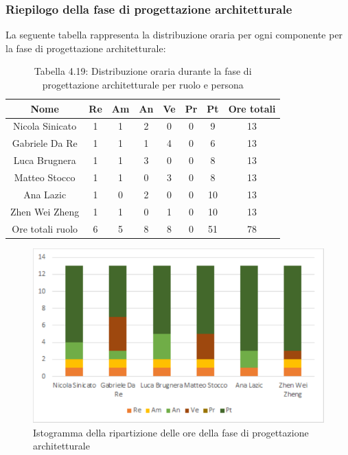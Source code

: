 \subsubsection{Riepilogo della fase di progettazione architetturale }
%
La seguente tabella rappresenta la distribuzione oraria per ogni componente per la fase di progettazione architetturale:
\begin{table}[h]
	\setlength\extrarowheight{5pt}
	\centering
	\begin{tabularx}{\textwidth}{|ccccccc|c|}
		\hline
		\rowcolor{white}
		\textbf{Nome} & \textbf{Re} & \textbf{Am} & \textbf{An} & \textbf{Ve} & \textbf{Pr}& \textbf{Pt} & \textbf{Ore totali} \\
		\hline
		Nicola Sinicato &1&1&2&0&0&9&13 \\
		Gabriele Da Re &1&1&1&4&0&6&13 \\
		Luca Brugnera &1&1&3&0&0&8&13 \\
		Matteo Stocco &1&1&0&3&0&8&13 \\
		Ana Lazic &1&0&2&0&0&10&13 \\
		Zhen Wei Zheng &1&1&0&1&0&10&13 \\
		\hline
		Ore totali ruolo &6&5&8&8&0&51&78 \\
		\hline
	\end{tabularx}
	\vspace{10pt}
	\caption{Tabella 4.19: Distribuzione oraria durante la fase di progettazione architetturale per ruolo e persona}
\end{table}
\begin{figure}[H]
    \centering
    \includegraphics[scale=0.6]{img/grafi preventivo/istogrammi/architetturale/complessivo.png}
    \caption{Istogramma della ripartizione delle ore della fase di progettazione architetturale}
\end{figure}
